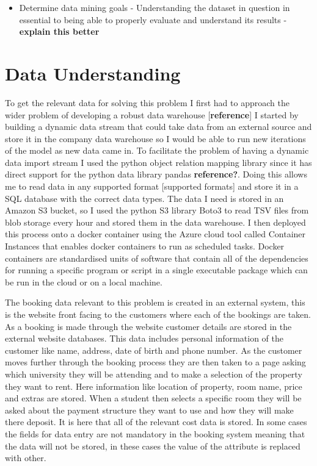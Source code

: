 \begin{itemize}
\item Determine data mining goals - Understanding the dataset in question in essential to being able to properly evaluate and understand its results - \textbf{explain this better}
\end{itemize}





\section{Data Understanding}

To get the relevant data for solving this problem I first had to approach the wider problem of developing a robust data warehouse [\textbf{reference}] I started by building a dynamic data stream that could take data from an external source and store it in the company data warehouse so I would be able to run new iterations of the model as new data came in. To facilitate the problem of having a dynamic data import stream I used the python object relation mapping library \cite{SQLAlchemyPython} since it has direct support for the python data library pandas \textbf{reference?}. Doing this allows me to read data in any supported format [supported formats] and store it in a SQL database with the correct data types. The data I need is stored in an Amazon S3 bucket, so I used the python S3 library Boto3 to read TSV files from blob storage every hour and stored them in the data warehouse. I then deployed this process onto a docker container using the Azure cloud tool called Container Instances that enables docker containers to run as scheduled tasks. Docker containers are standardised units of software that contain all of the dependencies for running a specific program or script in a single executable package which can be run in the cloud or on a local machine.

The booking data relevant to this problem is created in an external system, this is the website front facing to the customers where each of the bookings are taken. As a booking is made through the website customer details are stored in the external website databases. This data includes personal information of the customer like name, address, date of birth and phone number. As the customer moves further through the booking process they are then taken to a page asking which university they will be attending and to make a selection of the property they want to rent. Here information like location of property, room name, price and extras are stored. When a student then selects a specific room they will be asked about the payment structure they want to use and how they will make there deposit. It is here that all of the relevant cost data is stored. In some cases the fields for data entry are not mandatory in the booking system meaning that the data will not be stored, in these cases the value of the attribute is replaced with other.

